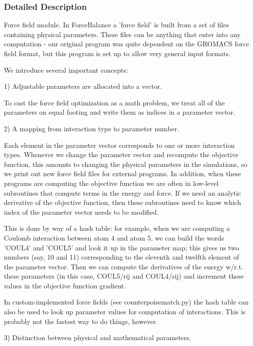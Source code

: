 \subsubsection{\-Detailed \-Description}
\-Force field module. \-In \-Force\-Balance a 'force field' is built from a set of files containing physical parameters. \-These files can be anything that enter into any computation -\/ our original program was quite dependent on the \-G\-R\-O\-M\-A\-C\-S force field format, but this program is set up to allow very general input formats.

\-We introduce several important concepts\-:

1) \-Adjustable parameters are allocated into a vector.

\-To cast the force field optimization as a math problem, we treat all of the parameters on equal footing and write them as indices in a parameter vector.

2) \-A mapping from interaction type to parameter number.

\-Each element in the parameter vector corresponds to one or more interaction types. \-Whenever we change the parameter vector and recompute the objective function, this amounts to changing the physical parameters in the simulations, so we print out new force field files for external programs. \-In addition, when these programs are computing the objective function we are often in low-\/level subroutines that compute terms in the energy and force. \-If we need an analytic derivative of the objective function, then these subroutines need to know which index of the parameter vector needs to be modified.

\-This is done by way of a hash table\-: for example, when we are computing a \-Coulomb interaction between atom 4 and atom 5, we can build the words '\-C\-O\-U\-L4' and '\-C\-O\-U\-L5' and look it up in the parameter map; this gives us two numbers (say, 10 and 11) corresponding to the eleventh and twelfth element of the parameter vector. \-Then we can compute the derivatives of the energy w/r.\-t. these parameters (in this case, \-C\-O\-U\-L5/rij and \-C\-O\-U\-L4/rij) and increment these values in the objective function gradient.

\-In custom-\/implemented force fields (see counterpoisematch.\-py) the hash table can also be used to look up parameter values for computation of interactions. \-This is probably not the fastest way to do things, however.

3) \-Distinction between physical and mathematical parameters.


